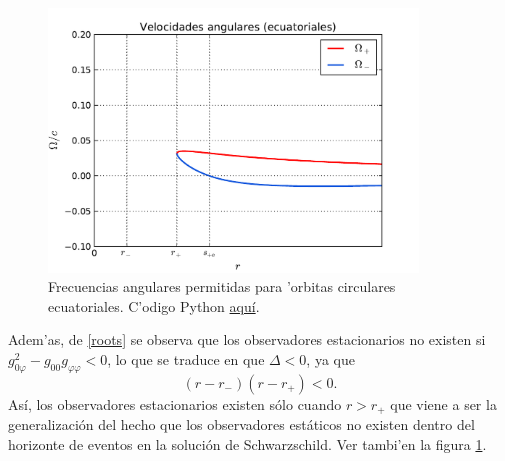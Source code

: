 \begin{figure}[H]
\centering
\includegraphics[height=7cm,angle=0]{fig/fig-omega-ecuatorial.pdf}
\caption{Frecuencias angulares permitidas para 'orbitas circulares ecuatoriales. C'odigo Python \href{https://github.com/gfrubi/GR/blob/master/figuras-editables/fig-omega-ecuatorial.py}{aqu\'i}.}
\label{fig:omegaecua}
\end{figure}

Adem'as, de \eqref{roots} se observa que los observadores estacionarios no existen si $g_{0\varphi}^2-g_{00}g_{\varphi \varphi}<0$, lo que se traduce en que $\Delta <0$, ya que
\begin{equation}
(r-r_-)(r-r_+)<0.
\end{equation}
As\'i, los observadores estacionarios existen s\'olo cuando $r>r_+$ que viene a ser la generalizaci\'on del hecho que los observadores est\'aticos no existen dentro del horizonte de eventos en la soluci\'on de Schwarzschild. Ver tambi'en la figura \ref{fig:omegaecua}.


